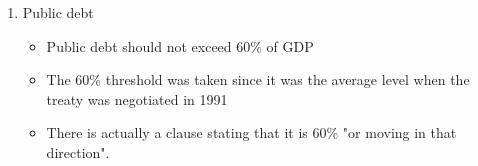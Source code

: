 \documentclass{tufte-handout}
\begin{document}
\begin{enumerate}
	\item Public debt
	\begin{itemize}
	  \item Public debt should not exceed 60\% of GDP
	  \item The 60\% threshold was taken since it was the average level when the treaty was negotiated in 1991
	  \item There is actually a clause stating that it is 60\% "or moving in that direction". 
	\end{itemize}
\end{enumerate}
\end{document}
